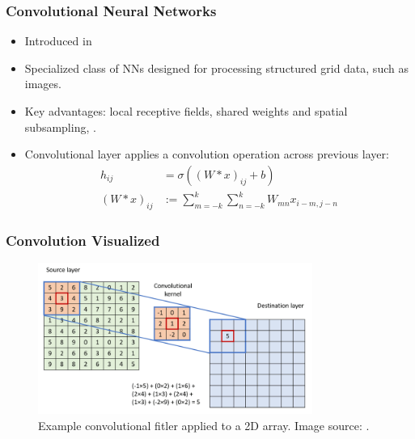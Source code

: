 \documentclass[handout]{beamer}
\begin{document}
\begin{frame}
    \frametitle{Convolutional Neural Networks}
     \begin{itemize}
         \item Introduced in {\color{blue}\cite{LECUN1998}}
        \item Specialized class of NNs designed for processing structured grid data, such as images.
        \item Key advantages: local receptive fields, shared weights and spatial subsampling, {\color{blue}\cite{ABRAMS2017}}.
        \item Convolutional layer applies a convolution operation across previous layer:
            \begin{equation}
                \begin{aligned}
                    h_{ij} &= \sigma\left((W * x)_{ij} + b\right) \\
                    (W * x)_{ij} &:= \sum_{m=-k}^{k}\sum_{n=-k}^{k} W_{mn} x_{i-m, j-n}
                \end{aligned}
            \end{equation}
    \end{itemize} 
\end{frame}

\begin{frame}
    \frametitle{Convolution Visualized}
    \begin{figure}[htpb]
        \centering
        \includegraphics[width=0.8\textwidth]{./images/conv.png}
        \caption{Example convolutional fitler applied to a 2D array. Image source: {\color{blue}\cite{PODAREANU2019}}.}
    \end{figure}
    
\end{frame}
\end{document}
